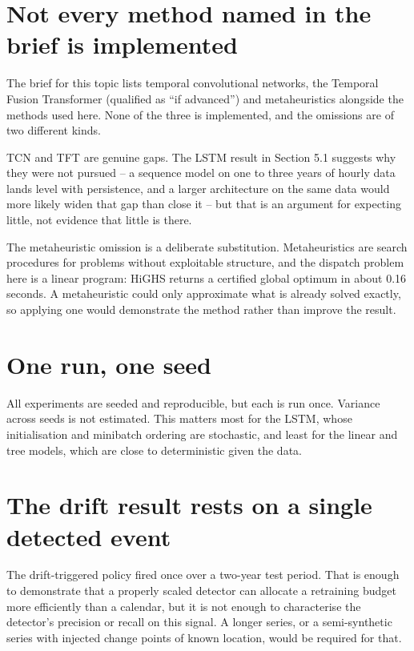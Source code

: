 \documentclass[11pt,a4paper,oneside]{report}
\begin{document}
\section{Not every method named in the brief is implemented}

The brief for this topic lists temporal convolutional networks, the Temporal Fusion Transformer (qualified as ``if advanced'') and metaheuristics alongside the methods used here. None of the three is implemented, and the omissions are of two different kinds.

TCN and TFT are genuine gaps. The LSTM result in Section 5.1 suggests why they were not pursued -- a sequence model on one to three years of hourly data lands level with persistence, and a larger architecture on the same data would more likely widen that gap than close it -- but that is an argument for expecting little, not evidence that little is there.

The metaheuristic omission is a deliberate substitution. Metaheuristics are search procedures for problems without exploitable structure, and the dispatch problem here is a linear program: HiGHS returns a certified global optimum in about 0.16 seconds. A metaheuristic could only approximate what is already solved exactly, so applying one would demonstrate the method rather than improve the result.

\section{One run, one seed}

All experiments are seeded and reproducible, but each is run once. Variance across seeds is not estimated. This matters most for the LSTM, whose initialisation and minibatch ordering are stochastic, and least for the linear and tree models, which are close to deterministic given the data.

\section{The drift result rests on a single detected event}

The drift-triggered policy fired once over a two-year test period. That is enough to demonstrate that a properly scaled detector can allocate a retraining budget more efficiently than a calendar, but it is not enough to characterise the detector's precision or recall on this signal. A longer series, or a semi-synthetic series with injected change points of known location, would be required for that.
\end{document}
